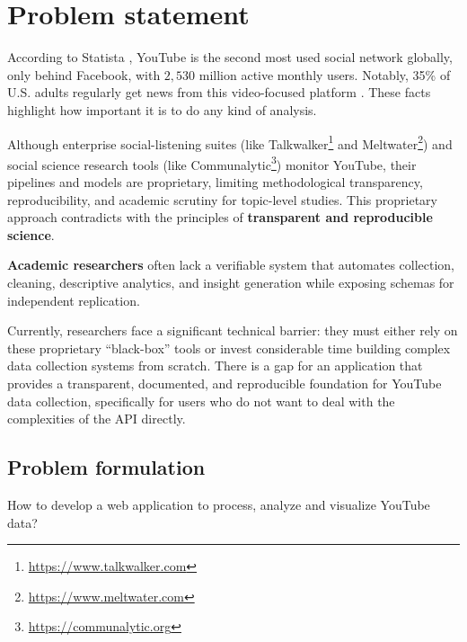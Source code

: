 \section{Problem statement}

According to Statista \cite{statista2025social}, YouTube is the second most used social network globally, only behind Facebook, with $2,530$ million active monthly users. Notably, 35\% of U.S. adults regularly get news from this video-focused platform \parencite{pewresearch2025social}. These facts highlight how important it is to do any kind of analysis.

Although enterprise social-listening suites (like {Talkwalker}\footnote{\url{https://www.talkwalker.com}} and {Meltwater}\footnote{\url{https://www.meltwater.com}}) and social science research tools (like {Communalytic}\footnote{\url{https://communalytic.org}}) monitor YouTube, their pipelines and models are proprietary, limiting methodological transparency, reproducibility, and academic scrutiny for topic-level studies. This proprietary approach contradicts with the principles of \textbf{transparent and reproducible science}.

\textbf{Academic researchers} often lack a verifiable system that automates collection, cleaning, descriptive analytics, and insight generation while exposing schemas for independent replication.

Currently, researchers face a significant technical barrier: they must either rely on these proprietary \enquote{black-box} tools or invest considerable time building complex data collection systems from scratch. There is a gap for an application that provides a transparent, documented, and reproducible foundation for YouTube data collection, specifically for users who do not want to deal with the complexities of the API directly.

\subsection{Problem formulation}

How to develop a web application to process, analyze and visualize YouTube data?
